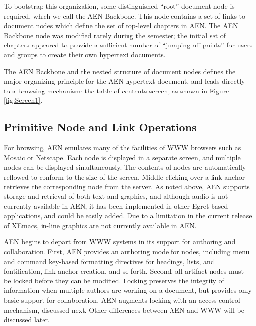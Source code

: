 To bootstrap this organization, some distinguished ``root'' document node
is required, which we call the AEN Backbone.  This node contains a set of
links to document nodes which define the set of top-level chapters in AEN.
The AEN Backbone node was modified rarely during the semester; the initial
set of chapters appeared to provide a sufficient number of ``jumping off
points'' for users and groups to create their own hypertext documents.

The AEN Backbone and the nested structure of document nodes defines the
major organizing principle for the AEN hypertext document, and leads directly to a
browsing mechanism: the table of contents screen, as shown in Figure
\ref{fig:Screen1}.

\begin{figure*}[htb]
 \centerline{}
 \caption{ This screen shot shows a portion of this 
 user's table of contents in the upper left screen, and a retrieved
 document node called ``Design'' in the upper right screen.  The Design
 node contains within it both a link to a figure called ``Figure 1'' and a
 comment called ``Regions'' immediately after it (represented in the
 Design node by the textual anchor ``[??]''.  Both the figure and the
 comment are retrieved and displayed in the screens in the lower left and
 lower right hand corners, respectively.}
 \label{fig:Screen1}
\end{figure*}


\subsection{Primitive Node and Link Operations}

For browsing, AEN emulates many of the facilities of WWW browsers such as
Mosaic or Netscape.  Each node is displayed in a separate screen, and
multiple nodes can be displayed simultaneously.  The contents of nodes are
automatically reflowed to conform to the size of the screen.
Middle-clicking over a link anchor retrieves the corresponding node from
the server.  As noted above, AEN supports storage and retrieval of both
text and graphics, and although audio is not currently
available in AEN, it has been implemented in other Egret-based
applications, and could be easily added.  Due to a limitation in the
current release of XEmacs, in-line graphics are not currently available in
AEN. 

AEN begins to depart from WWW systems in its support for authoring and
collaboration.  First, AEN provides an authoring mode for nodes, including
menu and command key-based formatting directives for headings, lists, and
fontification, link anchor creation, and so forth.  Second, all artifact
nodes must be locked before they can be modified.  Locking preserves the
integrity of information when multiple authors are working on a document,
but provides only basic support for collaboration.  AEN augments locking
with an access control mechanism, discussed next. Other differences between
AEN and WWW will be discussed later.


